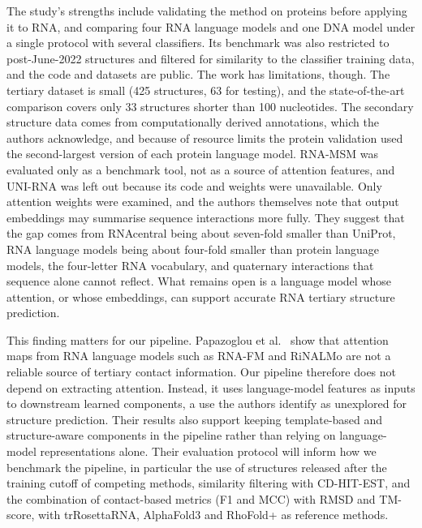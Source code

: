 \documentclass{FastFyp}
\begin{document}
The study's strengths include validating the method on proteins before applying it to RNA, and comparing four RNA language models and one DNA model under a single protocol with several classifiers. Its benchmark was also restricted to post-June-2022 structures and filtered for similarity to the classifier training data, and the code and datasets are public. The work has limitations, though. The tertiary dataset is small (425 structures, 63 for testing), and the state-of-the-art comparison covers only 33 structures shorter than 100 nucleotides. The secondary structure data comes from computationally derived annotations, which the authors acknowledge, and because of resource limits the protein validation used the second-largest version of each protein language model. RNA-MSM was evaluated only as a benchmark tool, not as a source of attention features, and UNI-RNA was left out because its code and weights were unavailable. Only attention weights were examined, and the authors themselves note that output embeddings may summarise sequence interactions more fully. They suggest that the gap comes from RNAcentral being about seven-fold smaller than UniProt, RNA language models being about four-fold smaller than protein language models, the four-letter RNA vocabulary, and quaternary interactions that sequence alone cannot reflect. What remains open is a language model whose attention, or whose embeddings, can support accurate RNA tertiary structure prediction.

This finding matters for our pipeline. Papazoglou et al.\ \cite{ref:Papazoglou:2025} show that attention maps from RNA language models such as RNA-FM and RiNALMo are not a reliable source of tertiary contact information. Our pipeline therefore does not depend on extracting attention. Instead, it uses language-model features as inputs to downstream learned components, a use the authors identify as unexplored for structure prediction. Their results also support keeping template-based and structure-aware components in the pipeline rather than relying on language-model representations alone. Their evaluation protocol will inform how we benchmark the pipeline, in particular the use of structures released after the training cutoff of competing methods, similarity filtering with CD-HIT-EST, and the combination of contact-based metrics (F1 and MCC) with RMSD and TM-score, with trRosettaRNA, AlphaFold3 and RhoFold+ as reference methods.
\end{document}
